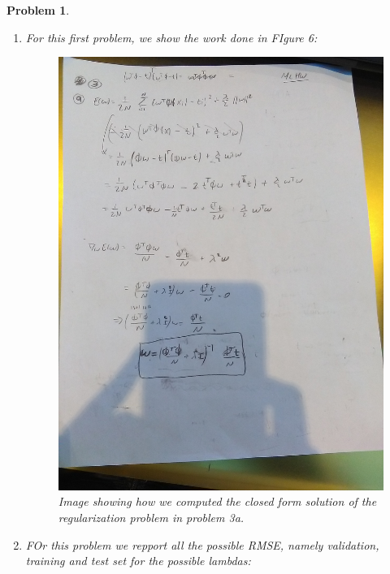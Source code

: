 \documentclass[12pt]{article}
\newtheorem{problem}{Problem}%
\begin{document}
\begin{problem}
\normalfont
\begin{enumerate}
\item For this first problem, we show the work done in FIgure 6:

\begin{figure}[!htbp]
\centering
\includegraphics[width=15cm, angle = 90]{Problem3a.jpg}
\caption{Image showing how we computed the closed form solution of the regularization problem in problem 3a.}
\end{figure}

\item FOr this problem we repport all the possible RMSE, namely validation, training and test set for the possible lambdas:


\end{enumerate}
\end{problem}
\end{document}
